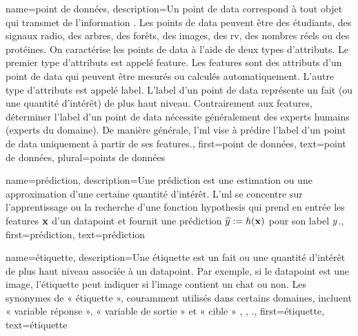 {name={point de données},
	description={Un point de \gls{data} correspond à tout objet qui transmet de l’information \cite{coverthomas}.  
		Les points de \gls{data} peuvent être des étudiants, des signaux radio, des arbres, des forêts, des images, des \gls{rv}, des nombres réels ou des protéines.  
		On caractérise les points de \gls{data} à l’aide de deux types d'attributs.  
		Le premier type d'attributs est appelé \gls{feature}. Les \glspl{feature} sont des attributs d’un point de \gls{data} qui peuvent être mesurés ou calculés automatiquement.  
		L'autre type d'attributs est appelé \gls{label}. L'\gls{label} d’un point de \gls{data} représente un fait (ou une quantité d’intérêt) de plus haut niveau.  
		Contrairement aux \glspl{feature}, déterminer l'\gls{label} d’un point de \gls{data} nécessite généralement des experts humains (experts du domaine).  
		De manière générale, l’\gls{ml} vise à prédire l'\gls{label} d’un point de \gls{data} uniquement à partir de ses \glspl{feature}.},
	first={point de données}, text={point de données}, plural={points de données}
}

{name={prédiction},
	description={Une prédiction est une estimation ou une approximation d’une certaine quantité d’intérêt.  
		L'\gls{ml} se concentre sur l’apprentissage ou la recherche d’une fonction \gls{hypothesis}  
		qui prend en entrée les \glspl{feature} ${\bf x}$ d’un \gls{datapoint} et fournit une prédiction  
		$\widehat{y} := h({\bf x})$ pour son \gls{label} $y$.},
	first={prédiction}, text={prédiction}
}

{name={étiquette},
	description={Une étiquette est un fait ou une quantité d’intérêt de plus haut niveau associée à un \gls{datapoint}.  
		Par exemple, si le \gls{datapoint} est une image, l’étiquette peut indiquer si l’image contient un chat ou non.  
		Les synonymes de « étiquette », couramment utilisés dans certains domaines, incluent « variable réponse », « variable de sortie » et « cible » \cite{Gujarati2021}, \cite{Dodge2003}, \cite{Everitt2022}.},
	first={étiquette}, text={étiquette}
}

